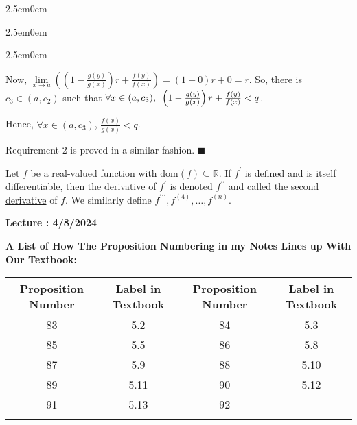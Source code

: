 \documentclass{book}
\newenvironment{allowTableDashes}{\ADLactivate}{\ADLinactivate}
\newcommand{\exOne}{%
   \color{Purple}%
   \fontsize{14}{16}\selectfont%
}
\newenvironment{myIndent}{%
   \begin{adjustwidth}{2.5em}{0em}%
}{%
   \end{adjustwidth}%
}
\newcommand{\udefine}[1]{{%
   \setulcolor{Red}%
   \setul{0.14em}{0.07em}%
   \ul{#1}%
}}
\newcommand{\pprime}{{\prime\prime}}
\newcommand{\ppprime}{{\prime\prime\prime}}
\newcommand{\myHS}{ \hspace{0.5em}}
\newcommand{\domain}[1]{\mathrm{dom}(#1)}
\newcommand{\retTwo}{\hfill\bigbreak}
\newcounter{LectureNumber}
\newcommand*{\markLecture}[1]{%
   \stepcounter{LectureNumber}%
   {\huge \color{Black} \textbf{Lecture \theLectureNumber: #1} \newline}%
}
\newcommand{\myVS}{\vphantom{$\int_a^b$}}
\begin{document}
{\begin{myIndent}
{\begin{myIndent}
{\begin{myIndent}
         Now, $\lim\limits_{x\rightarrow a}\left(\left(1 - \frac{g(y)}{g(x)}\right)r + \frac{f(y)}{f(x)}\right) = (1 - 0)r + 0 = r$. So, there is\\ $c_3 \in (a, c_2)$ such that $\forall x \in (a, c_3), \myHS \left(1 - \frac{g(y)}{g(x)}\right)r + \frac{f(y)}{f(x)} < q$.\retTwo

         Hence, $\forall x \in (a, c_3)$, $\frac{f(x)}{g(x)} < q$.\retTwo
      \end{myIndent}}
      
      Requirement 2 is proved in a similar fashion. $\blacksquare$\retTwo
   \end{myIndent}}
\end{myIndent}}

Let $f$ be a real-valued function with $\domain{f} \subseteq \mathbb{R}$. If $f^\prime$ is defined and is itself\\ differentiable, then the derivative of $f^\prime$ is denoted $f^\pprime$ and called the \udefine{second\\ derivative} of $f$. We similarly define $f^{\ppprime}, f^{(4)}, \ldots, f^{(n)}$.

\newpage

\markLecture{4/8/2024}














\newpage
{\huge \color{Black} \textbf{A List of How The Proposition Numbering in my Notes Lines up With Our Textbook:} \retTwo}
\exOne

\begin{allowTableDashes}
   \begin{tabular}{ c|c||c|c }
      Proposition Number & Label in Textbook & Proposition Number & Label in Textbook \\ \hline
      
      \myVS 83 & 5.2 & 84 & 5.3 \\ \hdashline[10pt/3pt]
      \myVS 85 & 5.5 & 86 & 5.8 \\ \hdashline[10pt/3pt]
      \myVS 87 & 5.9  & 88 & 5.10 \\ \hdashline[10pt/3pt]
      \myVS 89 & 5.11 & 90 & 5.12 \\ \hdashline[10pt/3pt]
      \myVS 91 & 5.13 & 92 &  \\ \hdashline[10pt/3pt]
   \end{tabular}

\end{allowTableDashes}
\end{document}
